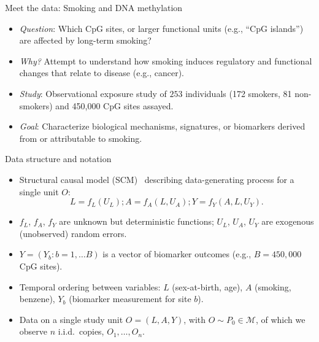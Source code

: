\documentclass{beamer}
\begin{document}

\begin{frame}[c]{Meet the data: Smoking and DNA methylation}
\begin{center}
\begin{itemize}
  \itemsep6pt
  \item \textit{Question}: Which CpG sites, or larger functional units (e.g.,
    ``CpG islands'') are affected by long-term smoking?
  \item \textit{Why?} Attempt to understand how smoking induces regulatory and
    functional changes that relate to disease (e.g., cancer).
  \item \textit{Study}: Observational exposure study of $253$ individuals (172
    smokers, 81 non-smokers) and 450,000 CpG sites assayed.
  \item \textit{Goal}: Characterize biological mechanisms, signatures, or
    biomarkers derived from or attributable to smoking.
\end{itemize}
\end{center}

\note{
}
\end{frame}


\begin{frame}[c]{Data structure and notation}
\begin{center}
\begin{itemize}
  \itemsep6pt
  \item Structural causal model (SCM)~\citep{pearl2000causality} describing
    data-generating process for a single unit $O$:
    \begin{equation*}\label{npsem}
        L = f_L(U_L); A = f_A(L, U_A); Y = f_Y(A, L, U_Y).
      \end{equation*}
  \item $f_L$, $f_A$, $f_Y$ are unknown but deterministic functions; $U_L$,
    $U_A$, $U_Y$ are exogenous (unobserved) random errors.
  \item $Y = (Y_b: b = 1, \ldots B)$ is a vector of biomarker outcomes (e.g.,
    $B = 450,000$ CpG sites).
  \item Temporal ordering between variables: $L$ (sex-at-birth, age), $A$
    (smoking, benzene), $Y_b$ (biomarker measurement for site $b$).
  \item Data on a single study unit $O = (L, A, Y)$, with $O \sim P_0 \in
    \mathcal{M}$, of which we observe $n$ i.i.d.~copies, $O_1, \ldots, O_n$.
\end{itemize}
\end{center}

\note{
}
\end{frame}
\end{document}
